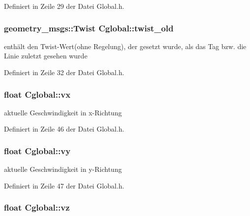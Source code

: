 Definiert in Zeile 29 der Datei Global.h.

\hypertarget{class_cglobal_ae99f21083838b00781e4461e3e7accb9}{
\subsubsection[{twist\_\-old}]{\setlength{\rightskip}{0pt plus 5cm}geometry\_\-msgs::Twist {\bf Cglobal::twist\_\-old}}}
\label{class_cglobal_ae99f21083838b00781e4461e3e7accb9}


enthält den Twist-\/Wert(ohne Regelung), der gesetzt wurde, als das Tag bzw. die Linie zuletzt gesehen wurde 



Definiert in Zeile 32 der Datei Global.h.

\hypertarget{class_cglobal_abafbed62176301706747c04ef3046aae}{
\subsubsection[{vx}]{\setlength{\rightskip}{0pt plus 5cm}float {\bf Cglobal::vx}}}
\label{class_cglobal_abafbed62176301706747c04ef3046aae}


aktuelle Geschwindigkeit in x-\/Richtung 



Definiert in Zeile 46 der Datei Global.h.

\hypertarget{class_cglobal_a0967372a0ede7b8b9a24957df663b7b3}{
\subsubsection[{vy}]{\setlength{\rightskip}{0pt plus 5cm}float {\bf Cglobal::vy}}}
\label{class_cglobal_a0967372a0ede7b8b9a24957df663b7b3}


aktuelle Geschwindigkeit in y-\/Richtung 



Definiert in Zeile 47 der Datei Global.h.

\hypertarget{class_cglobal_af9ef9759f83ae67b7e220570a7738ef5}{
\subsubsection[{vz}]{\setlength{\rightskip}{0pt plus 5cm}float {\bf Cglobal::vz}}}
\label{class_cglobal_af9ef9759f83ae67b7e220570a7738ef5}


